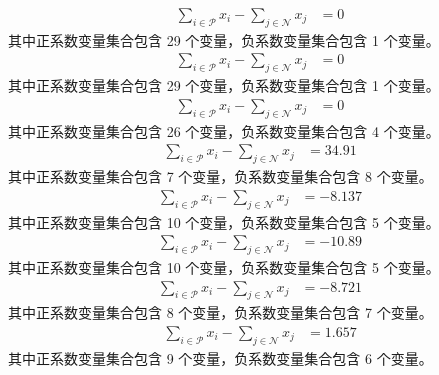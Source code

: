 \documentclass[a4paper,11pt]{article}
\begin{document}
\begin{align}
\sum_{i \in \mathcal{P}} x_i - \sum_{j \in \mathcal{N}} x_j &= 0 \nonumber
\end{align}
其中正系数变量集合包含 29 个变量，负系数变量集合包含 1 个变量。\\[0.3em]

\begin{align}
\sum_{i \in \mathcal{P}} x_i - \sum_{j \in \mathcal{N}} x_j &= 0 \nonumber
\end{align}
其中正系数变量集合包含 29 个变量，负系数变量集合包含 1 个变量。\\[0.3em]

\begin{align}
\sum_{i \in \mathcal{P}} x_i - \sum_{j \in \mathcal{N}} x_j &= 0 \nonumber
\end{align}
其中正系数变量集合包含 26 个变量，负系数变量集合包含 4 个变量。\\[0.3em]

\begin{align}
\sum_{i \in \mathcal{P}} x_i - \sum_{j \in \mathcal{N}} x_j &= 34.91 \nonumber
\end{align}
其中正系数变量集合包含 7 个变量，负系数变量集合包含 8 个变量。\\[0.3em]

\begin{align}
\sum_{i \in \mathcal{P}} x_i - \sum_{j \in \mathcal{N}} x_j &= -8.137 \nonumber
\end{align}
其中正系数变量集合包含 10 个变量，负系数变量集合包含 5 个变量。\\[0.3em]

\begin{align}
\sum_{i \in \mathcal{P}} x_i - \sum_{j \in \mathcal{N}} x_j &= -10.89 \nonumber
\end{align}
其中正系数变量集合包含 10 个变量，负系数变量集合包含 5 个变量。\\[0.3em]

\begin{align}
\sum_{i \in \mathcal{P}} x_i - \sum_{j \in \mathcal{N}} x_j &= -8.721 \nonumber
\end{align}
其中正系数变量集合包含 8 个变量，负系数变量集合包含 7 个变量。\\[0.3em]

\begin{align}
\sum_{i \in \mathcal{P}} x_i - \sum_{j \in \mathcal{N}} x_j &= 1.657 \nonumber
\end{align}
其中正系数变量集合包含 9 个变量，负系数变量集合包含 6 个变量。\\[0.3em]
\end{document}

